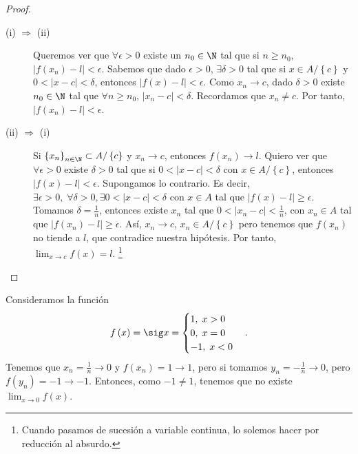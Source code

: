 \begin{proof}
\begin{description}
	\item[(i) $\displaystyle \Rightarrow $ (ii)] Queremos ver que $\displaystyle \forall \epsilon > 0 $ existe un $\displaystyle n_{0} \in \N $ tal que si $\displaystyle n \geq n_{0} $, $\displaystyle \left|f\left(x_{n}\right)-l\right|<\epsilon  $. Sabemos que dado $\displaystyle \epsilon > 0 $, $\displaystyle \exists \delta > 0 $ tal que si $\displaystyle x \in A/ \left\{ c\right\}  $ y $\displaystyle 0 < \left|x - c\right| < \delta  $, entonces $\displaystyle \left|f\left(x\right)-l\right| < \epsilon  $. Como $\displaystyle x_{n} \to c $, dado $\displaystyle \delta > 0 $ existe $\displaystyle n_{0} \in \N $ tal que $\displaystyle \forall n \geq n_{0} $, $\displaystyle \left|x_{n}-c\right| < \delta $. Recordamos que $\displaystyle x_{n} \neq c $. Por tanto, $\displaystyle \left|f\left(x_{n}\right)-l\right|<\epsilon  $.
	\item[(ii) $\displaystyle \Rightarrow $ (i)] Si $\displaystyle \left\{ x_{n}\right\} _{n\in\N}\subset A/ \left\{ c\right\}  $ y $\displaystyle x_{n}\to c $, entonces $\displaystyle f\left(x_{n}\right) \to l $. Quiero ver que $\displaystyle \forall \epsilon > 0 $ existe $\displaystyle \delta > 0 $ tal que si $\displaystyle 0 < \left|x-c\right| < \delta  $ con $\displaystyle x \in A/ \left\{ c\right\}  $, entonces $\displaystyle \left|f\left(x\right)-l\right|<\epsilon $. Supongamos lo contrario. Es decir, $\displaystyle \exists \epsilon > 0, \; \forall\delta>0, \exists 0 < \left|x-c\right|<\delta  $ con $\displaystyle x \in A $ tal que $\displaystyle \left|f\left(x\right)-l\right|\geq \epsilon  $. Tomamos $\displaystyle \delta = \frac{1}{n} $, entonces existe $\displaystyle x_{n} $ tal que $\displaystyle 0 < \left|x_{n}-c\right|<\frac{1}{n} $, con $\displaystyle x_{n} \in A $ tal que $\displaystyle \left|f\left(x_{n}\right)-l\right|\geq\epsilon $. Así, $\displaystyle x_{n}\to c $, $\displaystyle x_{n} \in A/ \left\{ c\right\}  $ pero tenemos que $\displaystyle f\left(x_{n}\right) $ no tiende a $\displaystyle l $, que contradice nuestra hipótesis. Por tanto, $\displaystyle \lim_{x \to c}f\left(x\right)=l $. \footnote{Cuando pasamos de sucesión a variable continua, lo solemos hacer por reducción al absurdo.} 
\end{description}
\end{proof}

\begin{eg}
\normalfont Consideramos la función
\[f\left(x\right) = \sig x =
\begin{cases}
1, \; x > 0 \\
0 , \; x = 0 \\
-1, \; x < 0
\end{cases}
.\]
Tenemos que $\displaystyle x_{n} = \frac{1}{n} \to 0 $ y $\displaystyle f\left(x_{n}\right) = 1 \to 1 $, pero si tomamos $\displaystyle y_{n} = -\frac{1}{n} \to 0 $, pero $\displaystyle f\left(y_{n}\right) = -1 \to -1$. Entonces, como $\displaystyle -1 \neq 1 $, tenemos que no existe $\displaystyle \lim_{x \to 0}f\left(x\right) $.
\end{eg}


